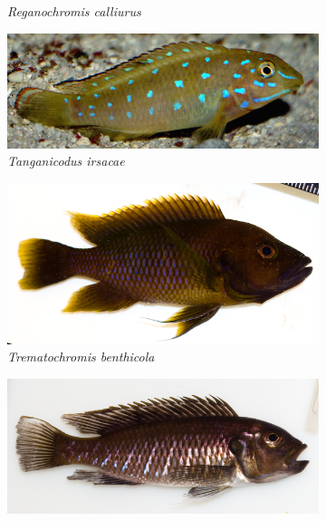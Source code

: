 \begin{figure}
\begin{subfigure}[t]{\fishfigwidth}
        \small
        \caption{\textit{Reganochromis calliurus}}
    \end{subfigure}
    \begin{subfigure}[t]{\fishfigwidth}
        \includegraphics[width=\fishfigwidth]{figures/host_phenotypes/Tanganicodus_irsacae}
        \small
        \caption{\textit{Tanganicodus irsacae}}
    \end{subfigure}
    \begin{subfigure}[t]{\fishfigwidth}
        \includegraphics[width=\fishfigwidth]{figures/host_phenotypes/Trematochromis_benthicola_large}
        \small
        \caption{\textit{Trematochromis benthicola}}
    \end{subfigure}
    \begin{subfigure}[t]{\fishfigwidth}
        \includegraphics[width=\fishfigwidth]{figures/host_phenotypes/Triglachromis_otostigma}

\end{subfigure}
\end{figure}
